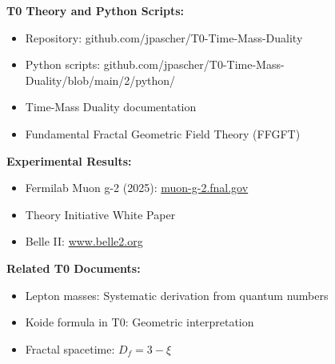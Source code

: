 	\textbf{T0 Theory and Python Scripts:}
	\begin{itemize}
		\item Repository: github.com/jpascher/T0-Time-Mass-Duality
		\item Python scripts: github.com/jpascher/T0-Time-Mass-Duality/blob/main/2/python/
		\item Time-Mass Duality documentation
		\item Fundamental Fractal Geometric Field Theory (FFGFT)
	\end{itemize}
	
	\textbf{Experimental Results:}
	\begin{itemize}
		\item Fermilab Muon g-2 (2025): \href{https://muon-g-2.fnal.gov/}{muon-g-2.fnal.gov}
		\item Theory Initiative White Paper
		\item Belle II: \href{https://www.belle2.org/}{www.belle2.org}
	\end{itemize}
	
	\textbf{Related T0 Documents:}
	\begin{itemize}
		\item Lepton masses: Systematic derivation from quantum numbers
		\item Koide formula in T0: Geometric interpretation
		\item Fractal spacetime: $D_f = 3 - \xi$
	\end{itemize}
	